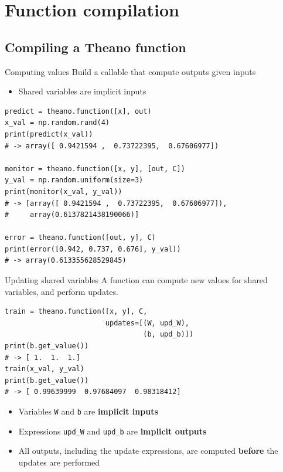 \documentclass[a4paper,9pt]{beamer}
\begin{document}
\section{Function compilation}
\begin{frame}
  \tableofcontents[currentsection]
\end{frame}

\subsection{Compiling a Theano function}

\begin{frame}[fragile]{Computing values}
  Build a callable that compute outputs given inputs
  \begin{itemize}
    \item Shared variables are implicit inputs
  \end{itemize}
  \begin{verbatim}
predict = theano.function([x], out)
x_val = np.random.rand(4)
print(predict(x_val))
# -> array([ 0.9421594 ,  0.73722395,  0.67606977])

monitor = theano.function([x, y], [out, C])
y_val = np.random.uniform(size=3)
print(monitor(x_val, y_val))
# -> [array([ 0.9421594 ,  0.73722395,  0.67606977]),
#     array(0.6137821438190066)]

error = theano.function([out, y], C)
print(error([0.942, 0.737, 0.676], y_val))
# -> array(0.613355628529845)
  \end{verbatim}
\end{frame}


\begin{frame}[fragile]{Updating shared variables}
  A function can compute new values for shared variables, and perform updates.
  \begin{verbatim}
train = theano.function([x, y], C,
                        updates=[(W, upd_W),
                                 (b, upd_b)])
print(b.get_value())
# -> [ 1.  1.  1.]
train(x_val, y_val)
print(b.get_value())
# -> [ 0.99639999  0.97684097  0.98318412]
  \end{verbatim}
  \begin{itemize}
    \item Variables \verb|W| and \verb|b| are {\bf implicit inputs}
    \item Expressions \verb|upd_W| and \verb|upd_b| are {\bf implicit outputs}
    \item All outputs, including the update expressions, are computed {\bf before} the updates are performed
  \end{itemize}
\end{frame}
\end{document}
